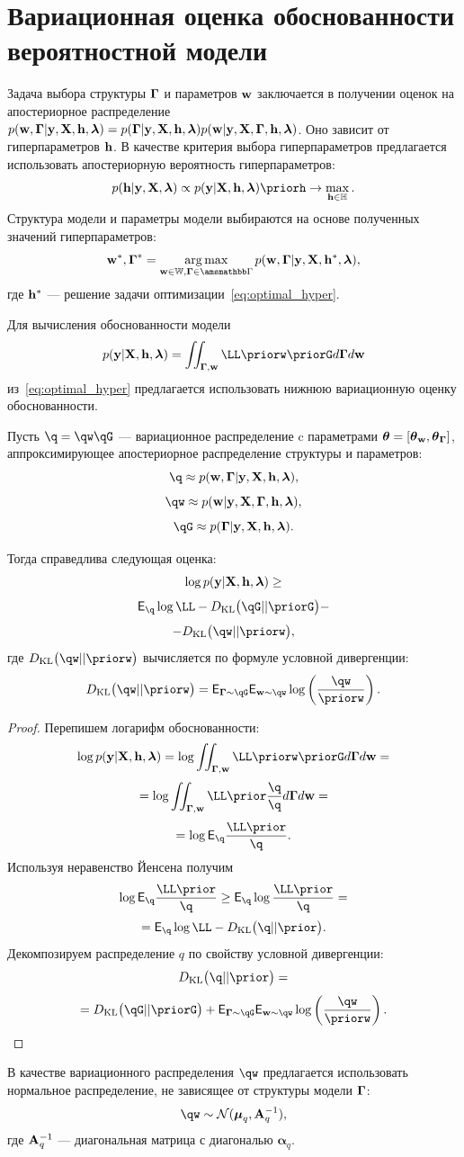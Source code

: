 \section{Вариационная оценка обоснованности вероятностной модели}
Задача выбора структуры $\boldsymbol{\Gamma}$ и параметров $\mathbf{w}$ заключается в получении оценок на апостериорное распределение $p(\mathbf{w}, \boldsymbol{\Gamma}|\mathbf{y}, \mathbf{X}, \mathbf{h},\boldsymbol{\lambda}) = p(\boldsymbol{\Gamma}|\mathbf{y}, \mathbf{X}, \mathbf{h},\boldsymbol{\lambda})p(\mathbf{w}|\mathbf{y}, \mathbf{X}, \boldsymbol{\Gamma}, \mathbf{h},\boldsymbol{\lambda})$. Оно зависит от гиперпараметров $\mathbf{h}$. 
В качестве критерия выбора гиперпараметров предлагается использовать апостериорную вероятность гиперпараметров:
\begin{equation}
\label{eq:optimal_hyper}
    \posth \propto \EV \priorh \to \max_{\h \in \Hb}.
\end{equation}
Структура модели и параметры модели выбираются на основе полученных значений гиперпараметров:
\[
    \w^*,\G^* = \argmax_{\w \in \Wb, \G \in \Gb} p(\w, \G|\y, \X, \h^*, \lam ),
\]
где $\mathbf{h}^*$ --- решение задачи оптимизации~\eqref{eq:optimal_hyper}.

Для вычисления обоснованности модели $$\EV = \iint_{\G, \w}\LL \priorw \priorG d\G d\w$$ из~\eqref{eq:optimal_hyper} предлагается использовать нижнюю вариационную оценку обоснованности.

\begin{theorem}
Пусть $\q = \qw \qG$ --- вариационное распределение c параметрами $\boldsymbol{\theta}= [\boldsymbol{\theta}_\mathbf{w}, \boldsymbol{\theta}_{\boldsymbol{\Gamma}} ]$, аппроксимирующее апостериорное распределение структуры и параметров:
\[
    \q \approx \post,
\]
\[
    \qw  \approx \postw,
\]
\[
    \qG \approx \postG.
\]

Тогда справедлива следующая оценка:
\begin{equation}
\label{eq:full_elbo}
\log p(\mathbf{y}|\mathbf{X}, \mathbf{h},\boldsymbol{\lambda}) \geq
\end{equation}
\[
 \E_{\q}  \log \LL - \KL{\qG}{\priorG} - 
\]
\[
 - \KL{\qw}{\priorw},
\]
где $\KL{\qw}{\priorw}$ вычисляется по формуле условной дивергенции:
\[
\KL{\qw}{\priorw} = \E_{\G \sim \qG} \E_{\w \sim \qw} \log \left(\frac{\qw}{\priorw}\right).
\]
\end{theorem}

\begin{proof}
Перепишем логарифм обоснованности:
\[
\log \EV  =  \log \iint_{\G,\w} \LL \priorw \priorG d\G d\w  =
\]
\[
   = \log\iint_{\G,\w} \LL \prior  \frac{\q}{\q}d\G d\w =
\]
\[
  =  \log \E_{\q} \frac{\LL \prior}{\q}.
\]
Используя неравенство Йенсена получим 
\[
 \log \E_{\q} \frac{\LL \prior}{\q} \geq  \E_{\q}\log \frac{\LL \prior}{\q} = 
\]
\[
 =  \E_{\q} \log \LL - \KL{\q}{\prior}.
\]
Декомпозируем распределение $q$ по свойству условной дивергенции:
\[
\KL{\q}{\prior} = 
\]
\begin{equation}
\label{eq:kl_full}
= \KL{\qG}{\priorG} + \E_{\G \sim \qG} \E_{\w \sim \qw} \log \left(\frac{\qw}{\priorw}\right).    
\end{equation}
\end{proof}
В качестве вариационного распределения $\qw$ предлагается использовать нормальное распределение, не зависящее от структуры модели $\boldsymbol{\Gamma}$:
\[
    \qw  \sim \mathcal{N}(\boldsymbol{\mu}_q, \A_q^{-1}), 
\]
где $\mathbf{A}_q^{-1}$ --- диагональная матрица с диагональю $\boldsymbol{\alpha}_q$.

